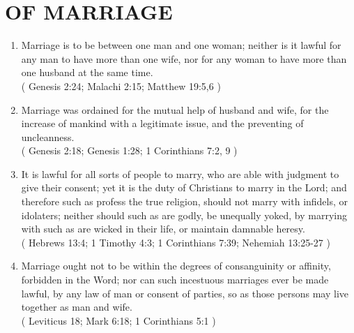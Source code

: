 \documentclass[12pt,a4paper]{book}
\begin{document}
\chapter{OF MARRIAGE}
\label{ch-mar}
\begin{enumerate}
\item
\label{ch-mar-1}
Marriage is to be between one man and one woman; neither is it lawful for any man to have more than one wife, nor for any woman to have more than one husband at the same time.\\
( Genesis 2:24; Malachi 2:15; Matthew 19:5,6 )
\item
\label{ch-mar-2}
Marriage was ordained for the mutual help of husband and wife, for the increase of mankind with a legitimate issue, and the preventing of uncleanness.\\
( Genesis 2:18; Genesis 1:28; 1 Corinthians 7:2, 9 )
\item
\label{ch-mar-3}
It is lawful for all sorts of people to marry, who are able with judgment to give their consent; yet it is the duty of Christians to marry in the Lord; and therefore such as profess the true religion, should not marry with infidels, or idolaters; neither should such as are godly, be unequally yoked, by marrying with such as are wicked in their life, or maintain damnable heresy.\\
( Hebrews 13:4; 1 Timothy 4:3; 1 Corinthians 7:39; Nehemiah 13:25-27 )
\item
\label{ch-mar-4}
Marriage ought not to be within the degrees of consanguinity or affinity, forbidden in the Word; nor can such incestuous marriages ever be made lawful, by any law of man or consent of parties, so as those persons may live together as man and wife.\\
( Leviticus 18; Mark 6:18; 1 Corinthians 5:1 )
\end{enumerate}
\end{document}
